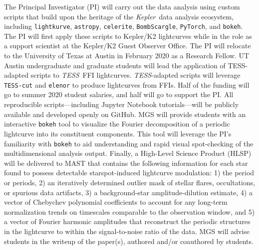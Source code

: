 \documentclass[letterpaper,11pt]{article}
\newcommand{\tess}{{\it TESS}}
\newcommand{\kepler}{{\it Kepler}}
\begin{document}
The Principal Investigator (PI) will carry out the data analysis using custom scripts that build upon the heritage of the \kepler\ data analysis ecosystem, including \texttt{lightkurve}, \texttt{astropy}, \texttt{celerite}, \texttt{BombScargle}, \texttt{PyTorch}, and \texttt{bokeh}.  The PI will first apply these scripts to Kepler/K2 lightcurves while in the role as a support scientist at the Kepler/K2 Guest Observer Office.  The PI will relocate to the University of Texas at Austin in February 2020 as a Research Fellow.  UT Austin undergraduate and graduate students will lead the application of TESS-adapted scripts to \tess\ FFI lightcurves.  \tess-adapted scripts will leverage \texttt{TESS-cut} and \texttt{elenor} to produce lightcurves from FFIs.  Half of the funding will go to summer 2020 student salaries, and half will go to support the PI.  All reproducible scripts---including Jupyter Notebook tutorials---will be publicly available and developed openly on GitHub.  MGS will provide students with an interactive \texttt{bokeh} tool to visualize the Fourier decomposition of a periodic lightcurve into its constituent components.  This tool will leverage the PI's familiarity with \texttt{bokeh} to aid understanding and rapid visual spot-checking of the multidimensional analysis output.  Finally, a High-Level Science Product (HLSP) will be delivered to MAST that contains the following information for each star found to possess detectable starspot-induced lightcurve modulation: 1) the period or periods, 2) an iteratively determined outlier mask of stellar flares, occultations, or spurious data artifacts, 3) a background-star amplitude-dilution estimate, 4) a vector of Chebychev polynomial coefficients to account for any long-term normalization trends on timescales comparable to the observation window, and 5) a vector of Fourier harmonic amplitudes that reconstruct the periodic structures in the lightcurve to within the signal-to-noise ratio of the data.  MGS will advise students in the writeup of the paper(s), authored and/or coauthored by students.


\end{document}
